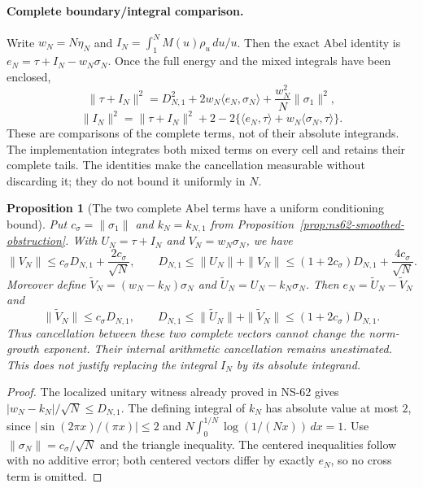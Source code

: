 \documentclass[11pt]{article}
\newtheorem{proposition}[theorem]{Proposition}
\theoremstyle{remark}
\begin{document}
\paragraph{Complete boundary/integral comparison.}
Write $w_N=N\eta_N$ and
$I_N=\int_1^N M(u)\rho_u\,du/u$.
Then the exact Abel identity is $e_N=\tau+I_N-w_N\sigma_N$.
Once the full energy and the mixed integrals have been enclosed,
\[
 \|\tau+I_N\|^2=D_{N,1}^2+2w_N\langle e_N,\sigma_N\rangle
                          +\frac{w_N^2}{N}\|\sigma_1\|^2,
\]
\[
 \|I_N\|^2=\|\tau+I_N\|^2+2
       -2\{\langle e_N,\tau\rangle+w_N\langle\sigma_N,\tau\rangle\}.
\]
These are comparisons of the complete terms, not of their absolute
integrands. The implementation integrates both mixed terms on every
cell and retains their complete tails. The identities make the
cancellation measurable without discarding it; they do not bound it
uniformly in $N$.

\begin{proposition}[The two complete Abel terms have a uniform conditioning bound]
\label{prop:ns67-abel-conditioning}
Put $c_\sigma=\|\sigma_1\|$ and $k_N=k_{N,1}$ from
Proposition~\ref{prop:ns62-smoothed-obstruction}. With
$U_N=\tau+I_N$ and $V_N=w_N\sigma_N$, we have
\begin{equation}
 \|V_N\|\leq c_\sigma D_{N,1}+\frac{2c_\sigma}{\sqrt N},\qquad
 D_{N,1}\leq\|U_N\|+\|V_N\|
 \leq(1+2c_\sigma)D_{N,1}+\frac{4c_\sigma}{\sqrt N}.
 \label{eq:ns67-conditioning}
\end{equation}
Moreover define $\widetilde V_N=(w_N-k_N)\sigma_N$ and
$\widetilde U_N=U_N-k_N\sigma_N$. Then
$e_N=\widetilde U_N-\widetilde V_N$ and
\begin{equation}
 \|\widetilde V_N\|\leq c_\sigma D_{N,1},\qquad
 D_{N,1}\leq\|\widetilde U_N\|+\|\widetilde V_N\|
                \leq(1+2c_\sigma)D_{N,1}.
 \label{eq:ns67-centered-conditioning}
\end{equation}
Thus cancellation between these two complete vectors cannot change the
norm-growth exponent. Their internal arithmetic cancellation remains
unestimated. This does not justify replacing the integral $I_N$ by
its absolute integrand.
\end{proposition}
\begin{proof}
The localized unitary witness already proved in NS-62 gives
$|w_N-k_N|/\sqrt N\leq D_{N,1}$.
The defining integral of $k_N$ has absolute value at most $2$, since
$|\sin(2\pi x)/(\pi x)|\leq2$ and
$N\int_0^{1/N}\log(1/(Nx))\,dx=1$.
Use $\|\sigma_N\|=c_\sigma/\sqrt N$ and the triangle inequality.
The centered inequalities follow with no additive error; both centered
vectors differ by exactly $e_N$, so no cross term is omitted.
\end{proof}
\end{document}
